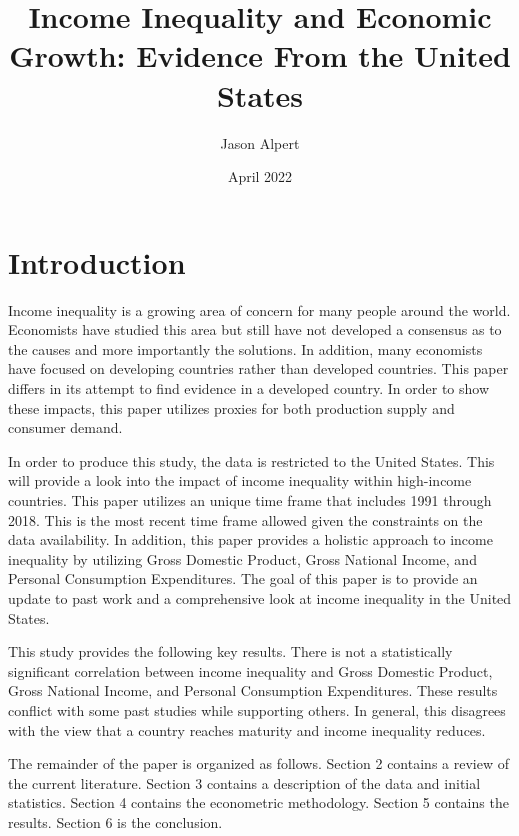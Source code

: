 \documentclass{article}
\title{Income Inequality and Economic Growth: Evidence From the United States}
\author{Jason Alpert }
\date{April 2022}
\begin{document}
\maketitle

\section{Introduction}
\vspace{2mm}

\quad Income inequality is a growing area of concern for many people around the world.  Economists have studied this area but still have not developed a consensus as to the causes and more importantly the solutions.  In addition, many economists have focused on developing countries rather than developed countries.  This paper differs in its attempt to find evidence in a developed country.  In order to show these impacts, this paper utilizes proxies for both production supply and consumer demand.
\vspace{2mm}


\quad In order to produce this study, the data is restricted to the United States.  This will provide a look into the impact of income inequality within high-income countries.  This paper utilizes an unique time frame that includes 1991 through 2018.  This is the most recent time frame allowed given the constraints on the data availability. In addition, this paper provides a holistic approach to income inequality by utilizing Gross Domestic Product, Gross National Income, and Personal Consumption Expenditures.  The goal of this paper is to provide an update to past work and a comprehensive look at income inequality in the United States.
\vspace{2mm}

\quad This study provides the following key results.  There is not a statistically significant correlation between income inequality and Gross Domestic Product, Gross National Income, and Personal Consumption Expenditures.    These results conflict with some past studies while supporting others.  In general, this disagrees with the view that a country reaches maturity and income inequality reduces.  
\vspace{2mm}

\quad The remainder of the paper is organized as follows.  Section 2 contains a review of the current literature. Section 3 contains a description of the data and initial statistics.  Section 4 contains the econometric methodology.  Section 5 contains the results.  Section 6 is the conclusion.  
\end{document}
